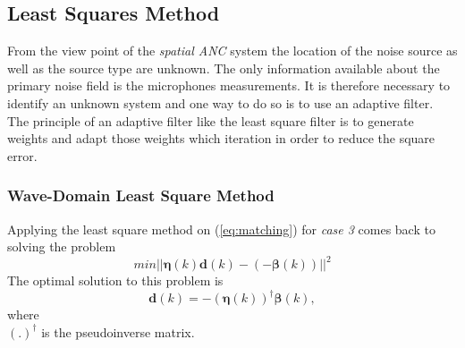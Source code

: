 \subsection{Least Squares Method}
From the view point of the \textit{spatial ANC} system the location of the noise source as well as the source type are unknown. The only information available about the primary noise field is the microphones measurements. It is therefore necessary to identify an unknown system and one way to do so is to use an adaptive filter. The principle of an adaptive filter like the least square filter is to generate weights and adapt those weights which iteration in order to reduce the square error\cite{Louv1984}.
\subsubsection{Wave-Domain Least Square Method}
Applying the least square method on (\ref{eq:matching}) for \textit{case 3} comes back to solving the problem
\begin{equation}
    min||\boldsymbol{\eta}(k)\boldsymbol{d}(k)-(-\boldsymbol{\beta}(k))||^2
\end{equation}
The optimal solution to this problem is\cite{Zhang2019}
\begin{equation}
    \boldsymbol{d}(k) = -(\boldsymbol{\eta}(k))^\dagger\boldsymbol{\beta}(k),
\end{equation}
where\\
$(.)^\dagger$ is the pseudoinverse matrix.